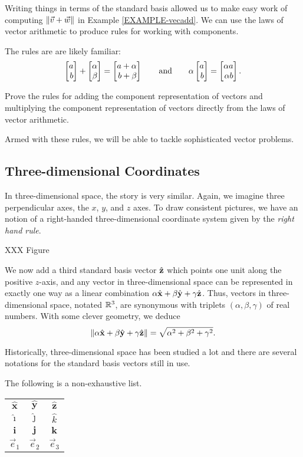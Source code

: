Writing things in terms of the standard basis allowed us to make easy work
of computing $\lVert\vec v+\vec w\rVert$ in Example \ref{EXAMPLE-vecadd}.  We can
use the laws of vector arithmetic to produce rules for working with components.

The rules are are likely familiar:
\[
	\mat{a\\b}+\mat{\alpha\\\beta} = \mat{a+\alpha\\b+\beta}
	\qquad\text{and}\qquad
	\alpha \mat{a\\b}=\mat{\alpha a\\\alpha b}.
\]

\begin{exercise}
	Prove the rules for adding the component representation
	of vectors and multiplying the component representation 
	of vectors directly from the laws of vector arithmetic.
\end{exercise}

Armed with these rules, we will be able to tackle sophisticated vector
problems.

\subsection{Three-dimensional Coordinates}
In three-dimensional space, the story is very similar.  Again, we imagine
three perpendicular axes, the $x$, $y$, and $z$ axes.  
To draw consistent
pictures, we have an notion of a right-handed three-dimensional coordinate
system given by the \emph{right hand rule}.

XXX Figure

We now add a third standard basis vector ${\hat {\mathbf z}}$ which points one
unit along the positive $z$-axis, and any vector in three-dimensional
space can be represented 
in exactly one way
as a linear combination $\alpha{\hat {\mathbf x}}+\beta{\hat {\mathbf y}}+\gamma{\hat {\mathbf z}}$.  Thus,
vectors in three-dimensional space, notated $\mathbb{R}^3$,
are synonymous with triplets $(\alpha,\beta,\gamma)$
of real numbers.  With some clever geometry, we deduce
\[
	\lVert\alpha{\hat {\mathbf x}}+\beta{\hat {\mathbf y}}+\gamma{\hat {\mathbf z}}\rVert=\sqrt{\alpha^2+\beta^2+\gamma^2}.
\]

Historically, three-dimensional space has been studied a lot and there
are several notations for the standard basis vectors still in use.

The following is a non-exhaustive list.
\begin{center}
	\begin{tabular}{c  c  c}
		$\hat{\mathbf{x}}$ & $\hat{\mathbf{y}}$ &$\hat{\mathbf{z}}$\\
		$\hat{\imath}$ & $\hat{\jmath}$ &$\hat{k}$\\
		$\mathbf{i}$ & $\mathbf j$ & $\mathbf k$\\
		$\vec e_1$ & $\vec e_2$ & $\vec e_3$
	\end{tabular}
\end{center}

